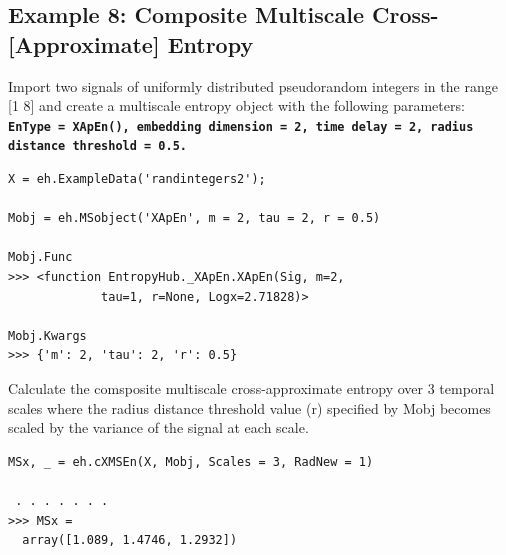 \documentclass[12pt, a4paper, titlepage, openany]{book}
\begin{document}
\subsection{\normalsize Example 8: \hspace{15mm}Composite Multiscale Cross-[Approximate] Entropy}
\noindent Import two signals of uniformly distributed pseudorandom integers in the range [1 8] and create a multiscale entropy object with the following parameters:\\
\texttt{\textbf{EnType =  XApEn(), embedding dimension = 2, time delay = 2, radius distance threshold = 0.5.}}
\begin{verbatim}
X = eh.ExampleData('randintegers2');

Mobj = eh.MSobject('XApEn', m = 2, tau = 2, r = 0.5)

Mobj.Func
>>> <function EntropyHub._XApEn.XApEn(Sig, m=2,
			 tau=1, r=None, Logx=2.71828)>

Mobj.Kwargs
>>> {'m': 2, 'tau': 2, 'r': 0.5}
\end{verbatim}
Calculate the comsposite multiscale cross-approximate entropy over 3 temporal scales where the radius distance threshold value (r) specified by Mobj becomes scaled by the variance of the signal at each scale.
\begin{verbatim}
MSx, _ = eh.cXMSEn(X, Mobj, Scales = 3, RadNew = 1)

 . . . . . . .
>>> MSx = 
  array([1.089, 1.4746, 1.2932])
\end{verbatim}


\newpage
\end{document}
